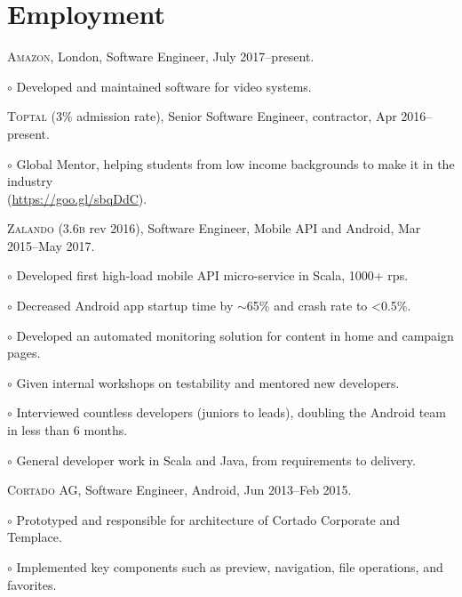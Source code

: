 \documentclass[letterpaper]{article}
\renewenvironment{itemize}{
  \begin{list}{}{
    \setlength{\leftmargin}{1.5em}
  }
}{
  \end{list}
}
\newenvironment{no-indent-itemize}{
  \begin{list}{}{
    \setlength{\leftmargin}{0em}
  }
}{
  \end{list}
}
\def\tilde{$\scriptstyle\sim$}
\def\bullet{$\circ$\xspace}
\begin{document}
\section*{Employment}
\begin{no-indent-itemize}
  \item \textsc{Amazon}, London, Software Engineer, July 2017--present.
  \begin{itemize}
    \item\bullet Developed and maintained software for video systems.
  \end{itemize}
  \item \textsc{Toptal} (3\% admission rate), Senior Software Engineer, contractor, Apr 2016--present.
  \begin{itemize}
    \item\bullet Global Mentor, helping students from low income backgrounds to make it in the industry \\  
    \phantom{\bullet }(\href{https://goo.gl/sbqDdC}{https://goo.gl/sbqDdC}).
  \end{itemize}
  \item \textsc{Zalando} (3.6\textsc{b} rev 2016), Software Engineer, 
         Mobile API and Android, Mar 2015--May 2017. 
  \begin{itemize}
    \item\bullet Developed first high-load mobile API micro-service in Scala, 1000+ rps.
    \item\bullet Decreased Android app startup time by \tilde 65\% and crash rate to <0.5\%.
    \item\bullet Developed an automated monitoring solution for content in home and campaign pages.
    \item\bullet Given internal workshops on testability and mentored new developers.
    \item\bullet Interviewed countless developers (juniors to leads), doubling the Android team in less than 6 months.
    \item\bullet General developer work in Scala and Java, from requirements to delivery.
  \end{itemize}
  \item \textsc{Cortado AG}, Software Engineer, Android, Jun 2013--Feb 2015.
  \begin{itemize}
    \item\bullet Prototyped and responsible for architecture of Cortado Corporate and Templace.
    \item\bullet Implemented key components such as preview, navigation, file operations, and favorites.

\end{itemize}
\end{no-indent-itemize}
\end{document}

